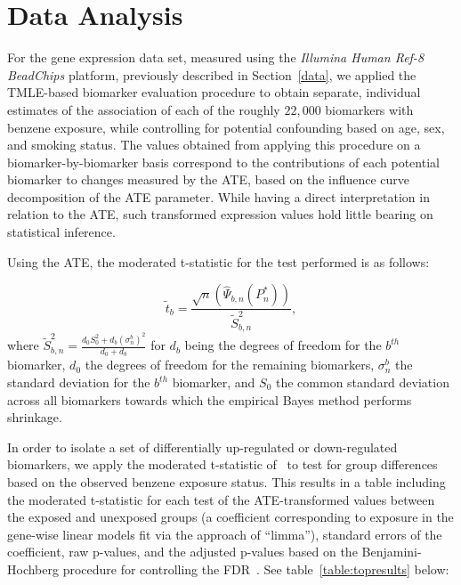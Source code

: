 \chapter{Data Analysis}

For the gene expression data set, measured using the \textit{Illumina Human
Ref-8 BeadChips} platform, previously described in Section~\ref{data}, we
applied the TMLE-based biomarker evaluation procedure to obtain separate,
individual estimates of the association of each of the roughly $22,000$
biomarkers with benzene exposure, while controlling for potential confounding
based on age, sex, and smoking status. The values obtained from applying this
procedure on a biomarker-by-biomarker basis correspond to the contributions of
each potential biomarker to changes measured by the ATE, based on the influence
curve decomposition of the ATE parameter. While having a direct interpretation
in relation to the ATE, such transformed expression values hold little bearing
on statistical inference.

Using the ATE, the moderated t-statistic for the test performed is as follows:

$$
\tilde{t}_b = \frac{\sqrt{n}(\hat{\Psi}_{b,n}(P_n^*))}{\tilde{S}_{b,n}^2}
,$$
where $\tilde{S}_{b,n}^2=\frac{d_0S_0^2+d_b (\sigma^b_n)^2}{d_0+d_b}$ for $d_b$
being the degrees of freedom for the $b^{th}$ biomarker, $d_0$ the degrees of
freedom for the remaining biomarkers, $\sigma^b_n$ the standard deviation for
the $b^{th}$ biomarker, and $S_0$ the common standard deviation across all
biomarkers towards which the empirical Bayes method performs shrinkage.

In order to isolate a set of differentially up-regulated or down-regulated
biomarkers, we apply the moderated t-statistic of~\cite{smyth2004linear} to
test for group differences based on the observed benzene exposure status. This
results in a table including the moderated t-statistic for each test of the
ATE-transformed values between the exposed and unexposed groups (a coefficient
corresponding to exposure in the gene-wise linear models fit via the approach of
``limma''), standard errors of the coefficient, raw p-values, and the adjusted
p-values based on the Benjamini-Hochberg procedure for controlling the
FDR~\cite{benjamini1995controlling}. See table~\ref{table:topresults} below:

